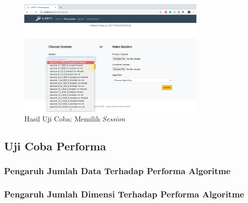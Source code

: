 \begin{figure}[H]
	\centering
	\includegraphics[width=9cm]{assets/img/bab5/hasil7.png}
	\caption{Hasil Uji Coba: Memilih \textit{Session}}
	\label{fig:hasil-performa7}
\end{figure}

\subsection{Uji Coba Performa}
\subsubsection{Pengaruh Jumlah Data Terhadap Performa Algoritme}

\subsubsection{Pengaruh Jumlah Dimensi Terhadap Performa Algoritme}